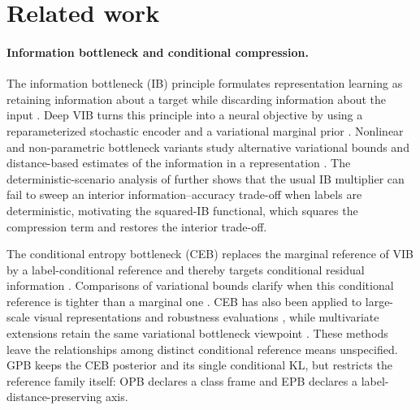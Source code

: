 \section{Related work}
\label{sec:related}

\paragraph{Information bottleneck and conditional compression.}
The information bottleneck (IB) principle formulates representation learning as
retaining information about a target while discarding information about the input
\citep{tishby2000information}. Deep VIB turns this principle into a neural
objective by using a reparameterized stochastic encoder and a variational marginal
prior \citep{alemi2017deep}. Nonlinear and non-parametric bottleneck variants study
alternative variational bounds and distance-based estimates of the information in a
representation \citep{kolchinsky2017nonlinear}. The deterministic-scenario analysis
of \citet{kolchinsky2019caveats} further shows that the usual IB multiplier can fail
to sweep an interior information--accuracy trade-off when labels are deterministic,
motivating the squared-IB functional, which squares the compression term and
restores the interior trade-off.

The conditional entropy bottleneck (CEB) replaces the marginal reference of VIB by a
label-conditional reference and thereby targets conditional residual information
\citep{fischer2020conditional}. Comparisons of variational bounds clarify when this
conditional reference is tighter than a marginal one
\citep{geiger2020variational}. CEB has also been applied to large-scale visual
representations and robustness evaluations \citep{fischer2020robustness,lee2021compressive},
while multivariate extensions retain the same variational bottleneck viewpoint
\citep{abdelaleem2025deep}. These methods leave the relationships among distinct
conditional reference means unspecified. GPB keeps the CEB posterior and its single
conditional KL, but restricts the reference family itself: OPB declares a class
frame and EPB declares a label-distance-preserving axis.

